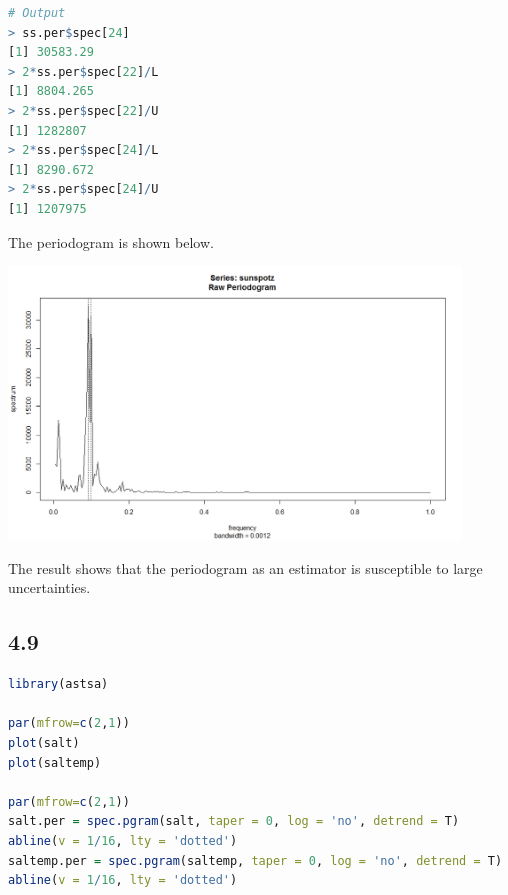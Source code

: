 \documentclass{article}
\begin{document}
\begin{CJK*}{GBK}{song}
\begin{lstlisting}[language=R,keywordstyle=\color{blue!70},commentstyle=\color{red!50!green!50!blue!50},frame=single,rulesepcolor=\color{red!20!green!20!blue!20},backgroundcolor=\color{backcolour},
]
# Output
> ss.per$spec[24]
[1] 30583.29
> 2*ss.per$spec[22]/L
[1] 8804.265
> 2*ss.per$spec[22]/U
[1] 1282807
> 2*ss.per$spec[24]/L
[1] 8290.672
> 2*ss.per$spec[24]/U
[1] 1207975
\end{lstlisting}
\newpage
The periodogram is shown below.
\begin{center}
\includegraphics[width=12cm]{1.png}
\end{center}
The result shows that the periodogram as an estimator is susceptible to large uncertainties.
\subsection*{4.9}
\begin{lstlisting}[language=R,keywordstyle=\color{blue!70},commentstyle=\color{red!50!green!50!blue!50},frame=single,rulesepcolor=\color{red!20!green!20!blue!20},backgroundcolor=\color{backcolour},
]
library(astsa)

par(mfrow=c(2,1))
plot(salt)
plot(saltemp)

par(mfrow=c(2,1))
salt.per = spec.pgram(salt, taper = 0, log = 'no', detrend = T)
abline(v = 1/16, lty = 'dotted')
saltemp.per = spec.pgram(saltemp, taper = 0, log = 'no', detrend = T)
abline(v = 1/16, lty = 'dotted')


\end{lstlisting}
\end{CJK*}
\end{document}
